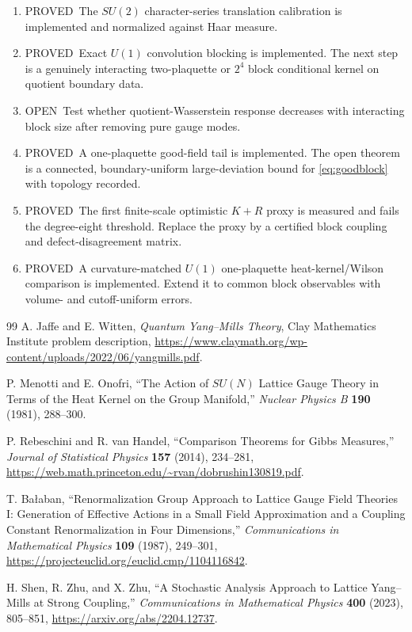 \documentclass[11pt]{article}
\newcommand{\Pstatus}{\textcolor{proved}{\textsf{PROVED}}}
\newcommand{\Ostatus}{\textcolor{open}{\textsf{OPEN}}}
\theoremstyle{remark}
\begin{document}
\begin{enumerate}[label=\textbf{N\arabic*.},leftmargin=3em]
\item[\textbf{N1.}] \Pstatus\ The $SU(2)$ character-series translation
      calibration is implemented and normalized against Haar measure.
\item[\textbf{N2.}] \Pstatus\ Exact $U(1)$ convolution blocking is
      implemented.  The next step is a genuinely interacting two-plaquette or
      $2^4$ block conditional kernel on quotient boundary data.
\item[\textbf{N3.}] \Ostatus\ Test whether quotient-Wasserstein response
      decreases with interacting block size after removing pure gauge modes.
\item[\textbf{N4.}] \Pstatus\ A one-plaquette good-field tail is implemented.
      The open theorem is a connected, boundary-uniform large-deviation bound
      for \eqref{eq:goodblock} with topology recorded.
\item[\textbf{N5.}] \Pstatus\ The first finite-scale optimistic $K+R$ proxy
      is measured and fails the degree-eight threshold.  Replace the proxy by
      a certified block coupling and defect-disagreement matrix.
\item[\textbf{N6.}] \Pstatus\ A curvature-matched $U(1)$ one-plaquette
      heat-kernel/Wilson comparison is implemented.  Extend it to common
      block observables with volume- and cutoff-uniform errors.
\end{enumerate}

\begin{thebibliography}{99}
A. Jaffe and E. Witten,
\emph{Quantum Yang--Mills Theory}, Clay Mathematics Institute problem
description,\newline
\url{https://www.claymath.org/wp-content/uploads/2022/06/yangmills.pdf}.

P. Menotti and E. Onofri,
``The Action of $SU(N)$ Lattice Gauge Theory in Terms of the Heat Kernel on
the Group Manifold,'' \emph{Nuclear Physics B} \textbf{190} (1981), 288--300.

P. Rebeschini and R. van Handel,
``Comparison Theorems for Gibbs Measures,''
\emph{Journal of Statistical Physics} \textbf{157} (2014), 234--281,\newline
\url{https://web.math.princeton.edu/~rvan/dobrushin130819.pdf}.

T. Ba\l aban,
``Renormalization Group Approach to Lattice Gauge Field Theories I:
Generation of Effective Actions in a Small Field Approximation and a Coupling
Constant Renormalization in Four Dimensions,''
\emph{Communications in Mathematical Physics} \textbf{109} (1987), 249--301,\newline
\url{https://projecteuclid.org/euclid.cmp/1104116842}.

H. Shen, R. Zhu, and X. Zhu,
``A Stochastic Analysis Approach to Lattice Yang--Mills at Strong Coupling,''
\emph{Communications in Mathematical Physics} \textbf{400} (2023), 805--851,\newline
\url{https://arxiv.org/abs/2204.12737}.
\end{thebibliography}
\end{document}
